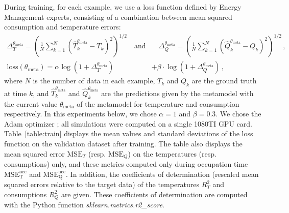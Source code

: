 \documentclass[12pt]{article}
\begin{document}
During training, for each example, we use a loss function defined by Energy Management experts, consisting of a combination between mean squared consumption and temperature errors:
\begin{align*}
    \Delta_T^{\theta_{\mathrm{meta}}} = \left(\frac{1}{N}\sum_{k=1}^N (\widehat T_k^{\theta_{\mathrm{meta}}} - T_k)^2\right)^{1/2}\quad\mathrm{and} & \quad
    \Delta_Q^{\theta_{\mathrm{meta}}} = \left(\frac{1}{N}\sum_{k=1}^N (\widehat Q_k^{\theta_{\mathrm{meta}}} - Q_k)^2\right)^{1/2}\,,                                                                              \\
    \mathrm{loss}(\theta_{\mathrm{meta}}) = \alpha\log(1 + \Delta_T^{\theta_{\mathrm{meta}}})                                                       & + \beta \cdot \log(1 + \Delta_Q^{\theta_{\mathrm{meta}}})\,,
\end{align*}
where $N$ is the number of data in each example, $T_k$ and $Q_k$ are the ground truth at time $k$, and $\widehat T_k^{\theta_{\mathrm{meta}}}$ and $\widehat Q_k^{\theta_{\mathrm{meta}}}$ are the predictions given by the metamodel with the current value $\theta_{\mathrm{meta}}$ of the metamodel for temperature and consumption respectively. In this experiments below, we chose $\alpha=1$ and $\beta=0.3$. We chose the Adam optimizer \cite{Kingma2015AdamAM} ; all simulations were computed on a single 1080TI GPU card. Table~\ref{table:train} displays the mean values and standard deviations of the loss function on the validation dataset after training. The table also displays the mean squared error $\mathrm{MSE}_T$ (resp. $\mathrm{MSE}_Q$) on the temperatures (resp. consumptions) only, and these metrics computed only during occupation time $\mathrm{MSE_T^{occ}}$ and $\mathrm{MSE_Q^{occ}}$.  In addition, the coefficients of determination (rescaled  mean squared errors relative to the
target data) of the temperatures $R^2_T$ and consumptions $R^2_Q$ are given. These coefficients of determination are computed with the Python function {\em sklearn.metrics.r2\_score}.

\end{document}
